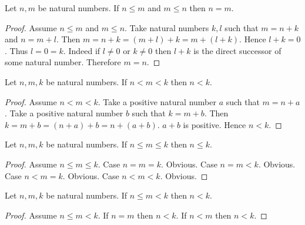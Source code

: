 \documentclass[10pt]{article}
\begin{document}
  \begin{forthel}
    \begin{proposition}
      Let $n, m$ be natural numbers.
      If $n \leq m$ and $m \leq n$ then $n = m$.
    \end{proposition}
    \begin{proof}
      Assume $n \leq m$ and $m \leq n$.
      Take natural numbers $k, l$ such that $m = n + k$ and $n = m + l$.
      Then $m
        = n + k
        = (m + l) + k
        = m + (l + k)$.
      Hence $l + k = 0$.
      Thus $l = 0 = k$.
      Indeed if $l \neq 0$ or $k \neq 0$ then $l + k$ is the direct successor of
      some natural number.
      Therefore $m = n$.
    \end{proof}
  \end{forthel}

  \begin{forthel}
    \begin{proposition}
      Let $n, m, k$ be natural numbers.
      If $n < m < k$ then $n < k$.
    \end{proposition}
    \begin{proof}
      Assume $n < m < k$.
      Take a positive natural number $a$ such that $m = n + a$.
      Take a positive natural number $b$ such that $k = m + b$.
      Then $k
        = m + b
        = (n + a) + b
        = n + (a + b)$.
      $a + b$ is positive.
      Hence $n < k$.
    \end{proof}
  \end{forthel}

  \begin{forthel}
    \begin{proposition}
      Let $n, m, k$ be natural numbers.
      If $n \leq m \leq k$ then $n \leq k$.
    \end{proposition}
    \begin{proof}
      Assume $n \leq m \leq k$.
      Case $n = m = k$. Obvious.
      Case $n = m < k$. Obvious.
      Case $n < m = k$. Obvious.
      Case $n < m < k$. Obvious.
    \end{proof}
  \end{forthel}

  \begin{forthel}
    \begin{proposition}
      Let $n, m, k$ be natural numbers.
      If $n \leq m < k$ then $n < k$.
    \end{proposition}
    \begin{proof}
      Assume $n \leq m < k$.
      If $n = m$ then $n < k$.
      If $n < m$ then $n < k$.
    \end{proof}
  \end{forthel}
\end{document}
